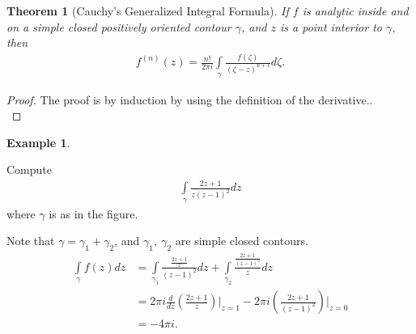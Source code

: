 \documentclass[12pt, a4paper]{article}
\theoremstyle{plain}
\newtheorem{thm}{Theorem} %
\theoremstyle{definition}
\newtheorem{example}{Example} %
\begin{document}
		\begin{thm}[Cauchy's Generalized Integral Formula]
			If $f$ is analytic inside and on a simple closed positively oriented contour $\gamma$, and $z$ is a point interior to $\gamma$, then
			\begin{align*}
				f^{(n)}(z) = \frac{n!}{2\pi i}\int\limits_{\gamma}\frac{f(\zeta)}{(\zeta-z)^{n+1}}d \zeta.
			\end{align*}
		\end{thm}

		\begin{proof}
			The proof is by induction by using the definition of the derivative..\\
		\end{proof}

		\begin{example}
			\begin{multicols}{2}
				Compute
				\begin{align*}
					\int\limits_{\gamma}\frac{2z+1}{z(z-1)^2}dz
				\end{align*}
				where $\gamma$ is as in the figure.
				\begin{figure}[H]
					\centering
				\end{figure}
			\end{multicols}
			Note that $\gamma=\gamma_1+\gamma_2$, and $\gamma_1,\:\gamma_2$ are simple closed contours.
			\begin{align*}
				\int\limits_{\gamma}f(z)dz &= 
				\int\limits_{\gamma_1}\frac{\frac{2z+1}{z}}{(z-1)^2}dz + 
				\int\limits_{\gamma_2}\frac{\frac{2z+1}{(z-1)^2}}{z}dz \\ &=
				2\pi i \frac{d}{dz}\left(\frac{2z+1}{z}\right)\Bigg|_{z=1} - 
				2\pi i \left(\frac{2z+1}{(z-1)^2}\right)\Bigg|_{z=0} \\ &=
				-4\pi i.\\
			\end{align*}
		\end{example}
\end{document}

